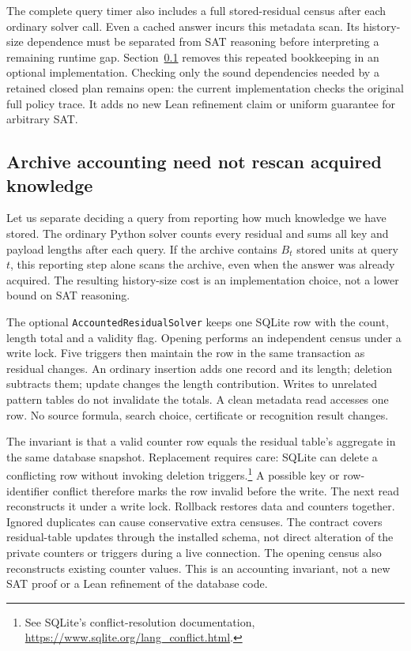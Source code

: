 \documentclass[11pt,a4paper]{article}
\numberwithin{equation}{section}
\theoremstyle{plain}
\theoremstyle{definition}
\theoremstyle{remark}
\begin{document}
The complete query timer also includes a full stored-residual census after each ordinary solver call. Even a cached answer incurs this metadata scan. Its history-size dependence must be separated from SAT reasoning before interpreting a remaining runtime gap. Section~\ref{sec:residual-accounting} removes this repeated bookkeeping in an optional implementation. Checking only the sound dependencies needed by a retained closed plan remains open: the current implementation checks the original full policy trace. It adds no new Lean refinement claim or uniform guarantee for arbitrary SAT.

\subsection{Archive accounting need not rescan acquired knowledge}
\label{sec:residual-accounting}

Let us separate deciding a query from reporting how much knowledge we have stored. The ordinary Python solver counts every residual and sums all key and payload lengths after each query. If the archive contains $B_t$ stored units at query $t$, this reporting step alone scans the archive, even when the answer was already acquired. The resulting history-size cost is an implementation choice, not a lower bound on SAT reasoning.

The optional \texttt{AccountedResidualSolver} keeps one SQLite row with the count, length total and a validity flag. Opening performs an independent census under a write lock. Five triggers then maintain the row in the same transaction as residual changes. An ordinary insertion adds one record and its length; deletion subtracts them; update changes the length contribution. Writes to unrelated pattern tables do not invalidate the totals. A clean metadata read accesses one row. No source formula, search choice, certificate or recognition result changes.

The invariant is that a valid counter row equals the residual table's aggregate in the same database snapshot. Replacement requires care: SQLite can delete a conflicting row without invoking deletion triggers.\footnote{See SQLite's conflict-resolution documentation, \url{https://www.sqlite.org/lang_conflict.html}.} A possible key or row-identifier conflict therefore marks the row invalid before the write. The next read reconstructs it under a write lock. Rollback restores data and counters together. Ignored duplicates can cause conservative extra censuses. The contract covers residual-table updates through the installed schema, not direct alteration of the private counters or triggers during a live connection. The opening census also reconstructs existing counter values. This is an accounting invariant, not a new SAT proof or a Lean refinement of the database code.
\end{document}
